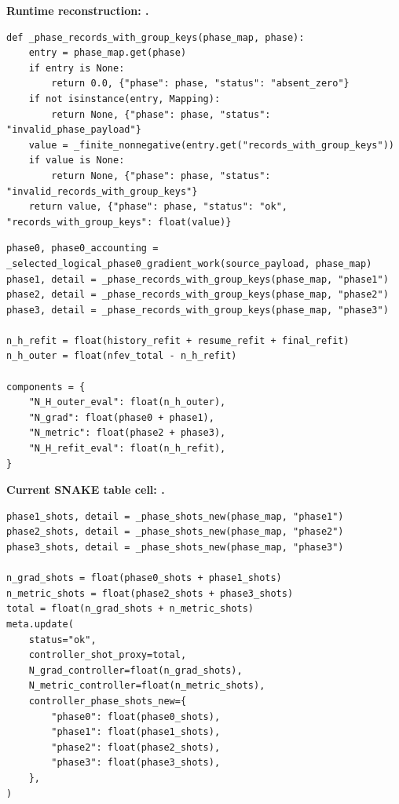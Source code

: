 \documentclass[10pt,twocolumn]{article}
\begin{document}
\textbf{\footnotesize Runtime reconstruction:
.}
\begin{lstlisting}
def _phase_records_with_group_keys(phase_map, phase):
    entry = phase_map.get(phase)
    if entry is None:
        return 0.0, {"phase": phase, "status": "absent_zero"}
    if not isinstance(entry, Mapping):
        return None, {"phase": phase, "status": "invalid_phase_payload"}
    value = _finite_nonnegative(entry.get("records_with_group_keys"))
    if value is None:
        return None, {"phase": phase, "status": "invalid_records_with_group_keys"}
    return value, {"phase": phase, "status": "ok", "records_with_group_keys": float(value)}
\end{lstlisting}

\begin{lstlisting}
phase0, phase0_accounting = _selected_logical_phase0_gradient_work(source_payload, phase_map)
phase1, detail = _phase_records_with_group_keys(phase_map, "phase1")
phase2, detail = _phase_records_with_group_keys(phase_map, "phase2")
phase3, detail = _phase_records_with_group_keys(phase_map, "phase3")

n_h_refit = float(history_refit + resume_refit + final_refit)
n_h_outer = float(nfev_total - n_h_refit)

components = {
    "N_H_outer_eval": float(n_h_outer),
    "N_grad": float(phase0 + phase1),
    "N_metric": float(phase2 + phase3),
    "N_H_refit_eval": float(n_h_refit),
}
\end{lstlisting}

\textbf{\footnotesize Current SNAKE table cell:
.}
\begin{lstlisting}
phase1_shots, detail = _phase_shots_new(phase_map, "phase1")
phase2_shots, detail = _phase_shots_new(phase_map, "phase2")
phase3_shots, detail = _phase_shots_new(phase_map, "phase3")

n_grad_shots = float(phase0_shots + phase1_shots)
n_metric_shots = float(phase2_shots + phase3_shots)
total = float(n_grad_shots + n_metric_shots)
meta.update(
    status="ok",
    controller_shot_proxy=total,
    N_grad_controller=float(n_grad_shots),
    N_metric_controller=float(n_metric_shots),
    controller_phase_shots_new={
        "phase0": float(phase0_shots),
        "phase1": float(phase1_shots),
        "phase2": float(phase2_shots),
        "phase3": float(phase3_shots),
    },
)
\end{lstlisting}
\end{document}
